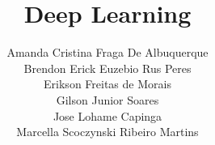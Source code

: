 \title{Deep Learning}
\label{chp:deep-learning}
\author{Amanda Cristina Fraga De Albuquerque\\
        Brendon Erick Euzebio Rus Peres\\
        Erikson Freitas de Morais\\
        Gilson Junior Soares\\
        Jose Lohame Capinga\\
        Marcella Scoczynski Ribeiro Martins}

%

\maketitle









